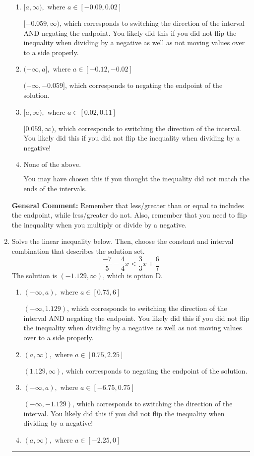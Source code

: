 \documentclass{extbook}[14pt]
\newcommand{\litem}[1]{\item #1

\rule{\textwidth}{0.4pt}}
\begin{document}
\begin{enumerate}
{\begin{enumerate}[label=\Alph*.]
* $(-\infty, 0.059]$, which is the correct option.
\item \( [a, \infty), \text{ where } a \in [-0.09, 0.02] \)

 $[-0.059, \infty)$, which corresponds to switching the direction of the interval AND negating the endpoint. You likely did this if you did not flip the inequality when dividing by a negative as well as not moving values over to a side properly.
\item \( (-\infty, a], \text{ where } a \in [-0.12, -0.02] \)

 $(-\infty, -0.059]$, which corresponds to negating the endpoint of the solution.
\item \( [a, \infty), \text{ where } a \in [0.02, 0.11] \)

 $[0.059, \infty)$, which corresponds to switching the direction of the interval. You likely did this if you did not flip the inequality when dividing by a negative!
\item \( \text{None of the above}. \)

You may have chosen this if you thought the inequality did not match the ends of the intervals.
\end{enumerate}

\textbf{General Comment:} Remember that less/greater than or equal to includes the endpoint, while less/greater do not. Also, remember that you need to flip the inequality when you multiply or divide by a negative.
}
\litem{
Solve the linear inequality below. Then, choose the constant and interval combination that describes the solution set.
\[ \frac{-7}{5} - \frac{4}{4} x < \frac{3}{3} x + \frac{6}{7} \]The solution is \( (-1.129, \infty) \), which is option D.\begin{enumerate}[label=\Alph*.]
\item \( (-\infty, a), \text{ where } a \in [0.75, 6] \)

 $(-\infty, 1.129)$, which corresponds to switching the direction of the interval AND negating the endpoint. You likely did this if you did not flip the inequality when dividing by a negative as well as not moving values over to a side properly.
\item \( (a, \infty), \text{ where } a \in [0.75, 2.25] \)

 $(1.129, \infty)$, which corresponds to negating the endpoint of the solution.
\item \( (-\infty, a), \text{ where } a \in [-6.75, 0.75] \)

 $(-\infty, -1.129)$, which corresponds to switching the direction of the interval. You likely did this if you did not flip the inequality when dividing by a negative!
\item \( (a, \infty), \text{ where } a \in [-2.25, 0] \)


\end{enumerate}}
\end{enumerate}
\end{document}
